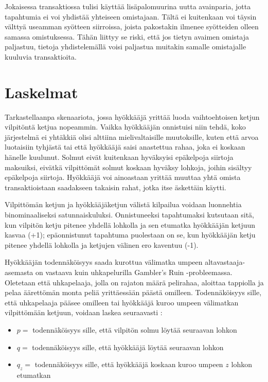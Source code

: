 \documentclass{article}
\begin{document}
Jokaisessa transaktiossa tulisi käyttää lisäpalomuurina uutta avainparia, jotta tapahtumia ei voi yhdistää yhteiseen omistajaan. Tältä ei kuitenkaan voi täysin välttyä useamman syötteen siirroissa, joista pakostakin ilmenee syöt\-tei\-den olleen samassa omistuksessa. Tähän liittyy se riski, että jos tietyn avaimen omistaja paljastuu, tietoja yhdistelemällä voisi paljastua muitakin samalle omistajalle kuuluvia transaktioita.

\section{Laskelmat}

Tarkastellaanpa skenaariota, jossa hyökkääjä yrittää luoda vaihtoehtoisen ketjun vilpitöntä ketjua nopeammin. Vaikka hyökkääjän onnistuisi niin tehdä, koko järjestelmä ei yhtäkkiä olisi alttiina mielivaltaisille muutoksille, kuten että arvoa luotaisiin tyhjästä tai että hyökkääjä saisi anastettua rahaa, joka ei koskaan hänelle kuulunut. Solmut eivät kuitenkaan hyväksyisi epäkelpoja siirtoja maksuiksi, eivätkä vilpittömät solmut koskaan hyväksy lohkoja, joihin sisältyy epäkelpoja siirtoja. Hyökkääjä voi ainoastaan yrittää muuttaa yhtä omista transaktioistaan saadakseen takaisin rahat, jotka itse äskettäin käytti.

Vilpittömän ketjun ja hyökkääjäketjun välistä kilpailua voidaan luonnehtia binominaaliseksi satunnaiskuluksi. Onnistuneeksi tapahtumaksi kutsutaan sitä, kun vilpitön ketju pitenee yhdellä lohkolla ja sen etumatka hyökkääjän ketjuun kasvaa (+1); epäonnistunut tapahtuma puolestaan on se, kun hyökkääjän ketju pitenee yhdellä lohkolla ja ketjujen välinen ero kaventuu (-1).

Hyökkääjän todennäköisyys saada kurottua välimatka umpeen altavastaaja-asemasta on vastaava kuin uhkapelurilla Gambler's Ruin -probleemassa. Oletetaan että uhkapelaaja, jolla on rajaton määrä pelirahaa, aloittaa tappiolla ja pelaa äärettömän monta peliä yrittäessään päästä omilleen. Todennäköisyys sille, että uhkapelaaja pääsee omilleen tai hyökkääjä kuroo umpeen välimatkan vilpittömään ketjuun, voidaan laskea seuraavasti \cite{8}:
\begin{itemize}
    \item[] $p =$ todennäköisyys sille, että vilpitön solmu löytää seuraavan lohkon
    \item[] $q =$ todennäköisyys sille, että hyökkääjä löytää seuraavan lohkon
    \item[] $q_{z} =$ todennäköisyys sille, että hyökkääjä koskaan kuroo umpeen $z$ lohkon etumatkan
\end{itemize}
\end{document}
